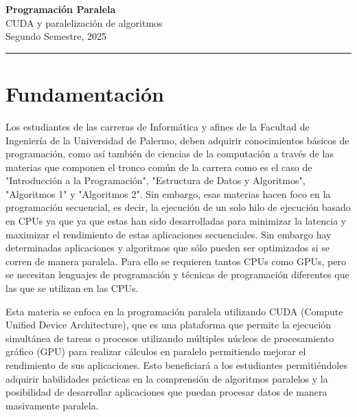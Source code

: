 



\begin{center}
    \LARGE\textbf{Programación Paralela} \\
    \Large{CUDA y paralelización de algoritmos} \\
    \normalsize{Segundo Semestre, 2025} \\
    \vspace{1em}
    \hrule
\end{center}

\vspace{1em}


\section*{Fundamentación}
Los estudiantes de las carreras de Informática y afines de la Facultad de Ingeniería de la Universidad de Palermo, deben
adquirir conocimientos básicos de programación, como así también de ciencias de la computación a través de las materias
que componen el tronco común de la carrera como es el caso de "Introducción a la Programación", "Estructura de Datos y
Algoritmos", "Algoritmos 1" y "Algoritmos 2". Sin embargo, esas materias hacen foco en la programación secuencial, es
decir, la ejecución de un solo hilo de ejecución basado en CPUs ya que ya que estas han sido desarrolladas para
minimizar la latencia y maximizar el rendimiento de estas aplicaciones secuenciales. Sin embargo hay determinadas
aplicaciones y algoritmos que sólo pueden ser optimizados si se corren de manera paralela. Para ello se requieren tantos
CPUs como GPUs, pero se necesitan lenguajes de programación y técnicas de programación diferentes que las que se
utilizan en las CPUs.

Esta materia se enfoca en la programación paralela utilizando CUDA (Compute Unified Device Architecture), que es una
plataforma que permite la ejecución simultánea de tareas o procesos utilizando múltiples núcleos de procesamiento
gráfico (GPU) para realizar cálculos en paralelo permitiendo mejorar el rendimiento de sus aplicaciones. Esto
beneficiará a los estudiantes permitiéndoles adquirir habilidades prácticas en la comprensión de algoritmos paralelos y
la posibilidad de desarrollar aplicaciones que puedan procesar datos de manera masivamente paralela.


